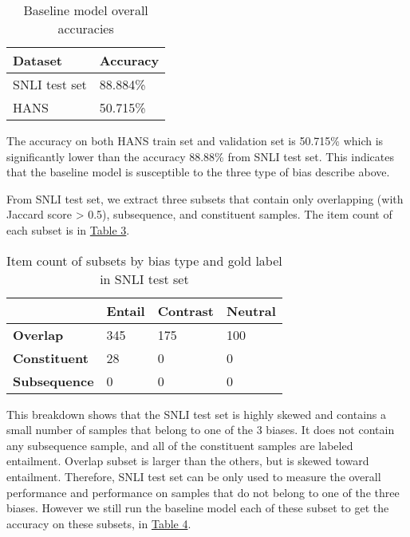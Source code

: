 \documentclass{article}
\begin{document}
\begin{table}[h]
    \label{table2}
    \caption{Baseline model overall accuracies}
    \centering
    \begin{tabular}{l l}
    \hline
    \textbf{Dataset}    & \textbf{Accuracy}    \\ \hline
    SNLI test set  & 88.884\%        \\
    HANS  & 50.715\%        \\ \hline
    \end{tabular}

\end{table}


The accuracy on both HANS train set and validation set is 50.715\% which is significantly lower than the accuracy 88.88\% from SNLI test set.
This indicates that the baseline model is susceptible to the three type of bias describe above.

From SNLI test set, we extract three subsets that contain only overlapping (with Jaccard score > 0.5), subsequence, and constituent samples.
The item count of each subset is in \hyperref[table3]{Table 3}.


\begin{table}[H]
    \caption{Item count of subsets by bias type and gold label in SNLI test set}
\label{table3}
\centering
\begin{tabular}{l l l l}
\hline
\textbf{}            & \textbf{Entail} & \textbf{Contrast} & \textbf{Neutral} \\ \hline
\textbf{Overlap}     & 345    & 175      & 100    \\
\textbf{Constituent} & 28     & 0        & 0      \\
\textbf{Subsequence} & 0      & 0        & 0      \\ \hline
\end{tabular}

\end{table}

This breakdown shows that the SNLI test set is highly skewed and contains a small number of samples that belong to one of the 3 biases.
It does not contain any subsequence sample, and all of the constituent samples are labeled entailment.
Overlap subset is larger than the others, but is skewed toward entailment.
Therefore, SNLI test set can be only used to measure the overall performance and performance on samples that do not belong to one of the three biases.
However we still run the baseline model each of these subset to get the accuracy on these subsets, in \hyperref[table4]{Table 4}.
\end{document}

